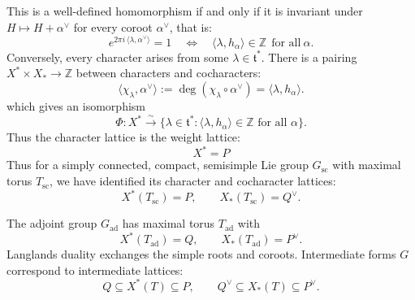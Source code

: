 \documentclass[12pt]{article}
\begin{document}
This is a well-defined homomorphism if and only if it is invariant under $H\mapsto H+\alpha^\vee$ for every coroot $\alpha^\vee$, that is:
\[
    e^{2\pi i\,\langle \lambda,\alpha^\vee\rangle}=1
    \quad\Longleftrightarrow\quad
    \langle \lambda,h_\alpha\rangle\in\mathbb{Z}\ \ \text{for all}\ \alpha.
\]
Conversely, every character arises from some $\lambda\in\mathfrak{t}^*$. There is a pairing $ X^* \times X_* \to \mathbb{Z}$
between characters and cocharacters:
\[
    \langle \chi_\lambda,\alpha^\vee \rangle := \deg(\chi_\lambda \circ \alpha^\vee) = \langle \lambda,h_\alpha\rangle.
\] which gives an isomorphism
\[
    \Phi: X^* \xrightarrow{\ \sim\ } \{ \lambda \in \mathfrak{t}^* : \langle \lambda,h_\alpha\rangle \in \mathbb{Z} \text{ for all } \alpha \}.
\]
Thus the character lattice is the weight lattice:
\[X^* = P\]
Thus for a simply connected, compact, semisimple Lie group $G_{\mathrm{sc}}$ with maximal torus $T_{\mathrm{sc}}$, we have identified its character and cocharacter lattices:
\[
    X^*(T_{\mathrm{sc}}) = P, \qquad X_*(T_{\mathrm{sc}}) = Q^\vee.
\]

The adjoint group $G_{\mathrm{ad}}$ has maximal torus $T_{\mathrm{ad}}$ with
\[
    X^*(T_{\mathrm{ad}}) = Q, \qquad X_*(T_{\mathrm{ad}}) = P^\vee.
\]
Langlands duality exchanges the simple roots and coroots. Intermediate forms $G$ correspond to intermediate lattices:
\[
    Q \subseteq X^*(T) \subseteq P, \qquad Q^\vee \subseteq X_*(T) \subseteq P^\vee.
\]
\end{document}
